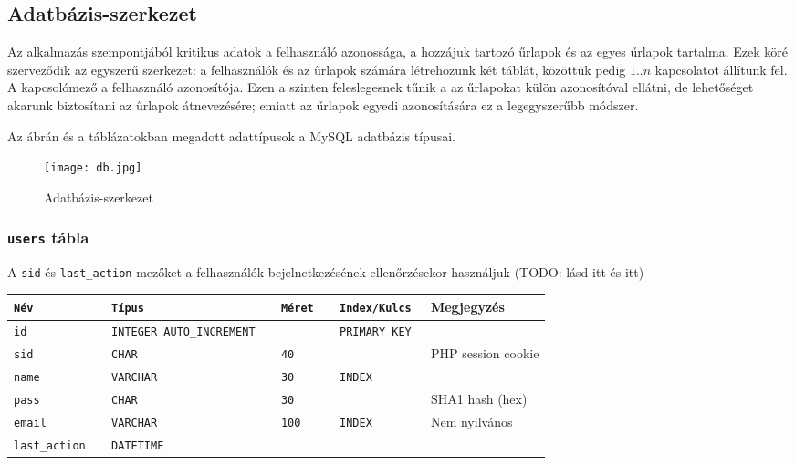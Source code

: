 \documentclass[12pt,a4paper,twoside]{article}
\begin{document}
\subsection{Adatbázis-szerkezet}

Az alkalmazás szempontjából kritikus adatok a felhasználó azonossága, a hozzájuk
tartozó űrlapok és az egyes űrlapok tartalma. Ezek köré szerveződik az egyszerű
szerkezet: a felhasználók és az űrlapok számára létrehozunk két táblát, közöttük
pedig $1..n$ kapcsolatot állítunk fel. A kapcsolómező a felhasználó
azonosítója. Ezen a szinten feleslegesnek tűnik a az űrlapokat külön
azonosítóval ellátni, de lehetőséget akarunk biztosítani az űrlapok
átnevezésére; emiatt az űrlapok egyedi azonosítására ez a legegyszerűbb módszer.

Az ábrán és a táblázatokban megadott adattípusok a MySQL adatbázis típusai.

\begin{figure}[htp]
\centering
\texttt{[image: db.jpg]}
\caption{Adatbázis-szerkezet}\label{fig:db}
\end{figure}

\subsubsection{\texttt{users} tábla}
A \texttt{sid} és \texttt{last\_action} mezőket a felhasználók bejelnetkezésének
ellenőrzésekor használjuk (TODO: lásd itt-és-itt)

\small
\vspace{.3cm}
\begin{tabular*}{\textwidth}{>{\tt}l>{\tt}l>{\tt}l>{\tt}l|l}
\rm Név       &  \rm Típus  &  \rm Méret  & \rm Index/Kulcs & Megjegyzés           \\
\hline
 id           &   INTEGER AUTO\_INCREMENT && PRIMARY KEY    &                      \\
 sid          &   CHAR      & 40          &                 &  PHP session cookie  \\
 name         &   VARCHAR   & 30          & INDEX           &                      \\
 pass         &   CHAR      & 30          &                 &  SHA1 hash (hex)     \\
 email        &   VARCHAR   & 100         & INDEX           &  Nem nyilvános       \\
 last\_action &   DATETIME  &             &                 &                      \\
\end{tabular*}
\normalsize
\end{document}

